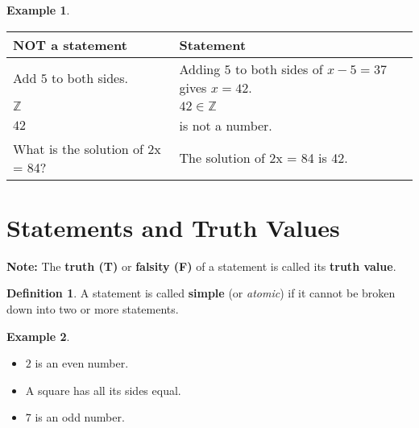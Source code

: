 \documentclass[
]{book}
\providecommand{\tightlist}{%
  \setlength{\itemsep}{0pt}\setlength{\parskip}{0pt}}
\theoremstyle{definition}
\newtheorem{definition}{Definition}[chapter]
\theoremstyle{definition}
\newtheorem{example}{Example}[chapter]
\theoremstyle{definition}
\theoremstyle{definition}
\theoremstyle{remark}
\begin{document}
\begin{example}
\protect\hypertarget{exm:unnamed-chunk-6}{}\label{exm:unnamed-chunk-6}\leavevmode

\begin{longtable}[]{@{}
  >{\raggedright\arraybackslash}p{}
  >{\raggedright\arraybackslash}p{}@{}}
\toprule\noalign{}
\begin{minipage}[b]{\linewidth}\raggedright
\textbf{NOT a statement}
\end{minipage} & \begin{minipage}[b]{\linewidth}\raggedright
\textbf{Statement}
\end{minipage} \\
\midrule\noalign{}
\endhead
\bottomrule\noalign{}
\endlastfoot
Add \(5\) to both sides. & Adding \(5\) to both sides of \(x − 5 = 37\) gives \(x = 42\). \\
\(\mathbb{Z}\) & \(42 \in \mathbb{Z}\) \\
\(42\) & 42 is not a number. \\
What is the solution of 2x = 84? & The solution of 2x = 84 is 42. \\
\end{longtable}

\end{example}

\section{Statements and Truth Values}\label{statements-and-truth-values}

\textbf{Note:} The \textbf{truth (T)} or \textbf{falsity (F)} of a statement is called its \textbf{truth value}.

\begin{definition}
\protect\hypertarget{def:unnamed-chunk-7}{}\label{def:unnamed-chunk-7}A statement is called \textbf{simple} (or \emph{atomic}) if it cannot be broken down into two or more statements.
\end{definition}

\begin{example}
\protect\hypertarget{exm:unnamed-chunk-8}{}\label{exm:unnamed-chunk-8}\leavevmode

\begin{itemize}
\tightlist
\item
  \(2\) is an even number.
\item
  A square has all its sides equal.
\item
  \(7\) is an odd number.
\end{itemize}

\end{example}
\end{document}

